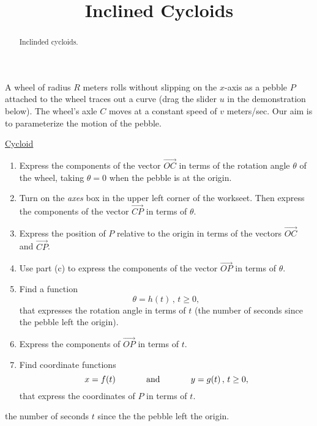 \documentclass{ximera}
\title{Inclined Cycloids}
\begin{document}
\begin{abstract}
Inclinded cycloids.
\end{abstract}
\maketitle

\begin{exploration}  \label{Exhjjjjnbbbbbr}

A wheel of radius $R$ meters rolls without slipping on the $x$-axis as a pebble $P$ attached to the wheel traces out a curve (drag the slider $u$ in the demonstration below). The wheel's axle $C$ moves  at a constant speed of $v$ meters/sec. Our aim is to parameterize the motion of the pebble.


\href{https://www.geogebra.org/classic/vxbjccpa}{Cycloid}

 
\begin{onlineOnly}
    \begin{center}
\end{center}
\end{onlineOnly}


\begin{enumerate}
\item Express the components of the vector $\overrightarrow{OC}$ in terms of the rotation angle $\theta$ of the wheel, taking $\theta=0$ when the pebble is at the origin.

\item Turn on the \emph{axes} box in the upper left corner of the workseet. Then express the components of the vector $\overrightarrow{CP}$ in terms of $\theta$.

\item Express the position of $P$ relative to the origin in terms of the vectors $\overrightarrow{OC}$ and $\overrightarrow{CP}$.

\item Use part (c) to express the components of the vector $\overrightarrow{OP}$ in terms of $\theta$.

\item Find a function 
\[
   \theta = h(t)  \, , \, t\geq 0, 
\]
that expresses the rotation angle in terms of $t$ (the number of seconds since the pebble left the origin).

\item Express the components of $\overrightarrow{OP}$ in terms of $t$.

\item Find coordinate functions
\[
    x=f(t)   \hskip 0.5in \text{and} \hskip 0.5in y=g(t) \, , \, t\geq 0 ,
\]
that express the coordinates of $P$ in terms of $t$.
\end{enumerate}



the number of seconds $t$ since the the pebble left the origin.

\end{exploration}
\end{document}
